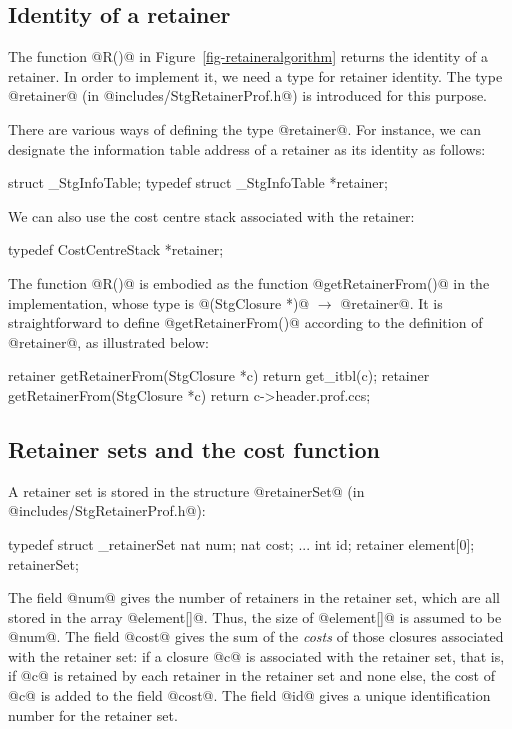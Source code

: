\documentclass{article}
\begin{document}
\subsection{Identity of a retainer}

The function @R()@ in Figure~\ref{fig-retaineralgorithm} returns
the identity of a retainer. In order to implement it, we need 
a type for retainer identity.
The type @retainer@ (in @includes/StgRetainerProf.h@) is introduced for
this purpose. 

There are various ways of defining the type @retainer@. 
For instance, we can designate the information table address of a retainer as
its identity as follows:

\begin{code}
struct _StgInfoTable;
typedef struct _StgInfoTable *retainer;
\end{code}

We can also use the cost centre stack associated with the retainer:

\begin{code}
typedef CostCentreStack *retainer;
\end{code}

The function @R()@ is embodied as the function @getRetainerFrom()@ in the 
implementation, whose type is @(StgClosure *)@ $\rightarrow$ @retainer@.
It is straightforward to define @getRetainerFrom()@ according to the definition
of @retainer@, as illustrated below:

\begin{code}
retainer getRetainerFrom(StgClosure *c) { return get_itbl(c); }
retainer getRetainerFrom(StgClosure *c) { return c->header.prof.ccs; }
\end{code}

\subsection{Retainer sets and the cost function}

A retainer set is stored in the structure @retainerSet@ 
(in @includes/StgRetainerProf.h@):

\begin{code}
typedef struct _retainerSet {
  nat num;
  nat cost;
  ...
  int id;
  retainer element[0];
} retainerSet;
\end{code}

The field @num@ gives the number of retainers in the retainer set, which
are all stored in the array @element[]@. Thus, the size of @element[]@
is assumed to be @num@.
The field @cost@ gives the sum of the \emph{costs} of those closures 
associated with the retainer set: if a closure @c@ is
associated with the retainer set, that is, if @c@ is retained by each
retainer in the retainer set and none else,
the cost of @c@ is added to the field @cost@. 
The field @id@ gives a unique identification number for the retainer set.
\end{document}
